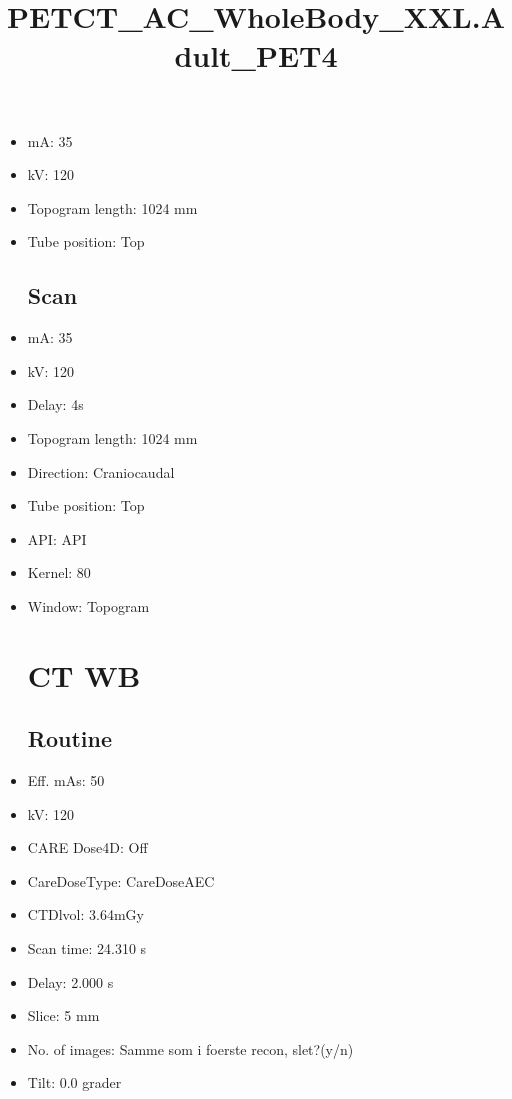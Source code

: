 \documentclass[12pt]{article}
\title{PETCT\_AC\_WholeBody\_XXL.Adult\_PET4}
\begin{document}
\maketitle
\newpage
\tableofcontents
\newpage
{}


\begin{itemize}\section{Topogram}
\subsection{Routine}
\item mA: 35\item kV: 120\item Topogram length: 1024 mm\item Tube position: Top
\subsection{Scan}\item mA: 35\item kV: 120\item Delay: 4s\item Topogram length: 1024 mm\item Direction: Craniocaudal\item Tube position: Top\item API: API \item Kernel: 80\item Window: Topogram
\section{CT WB}
\subsection{Routine}
\item Eff. mAs: 50\item kV: 120\item CARE Dose4D: Off\item CareDoseType: CareDoseAEC\item CTDlvol: 3.64mGy\item Scan time: 24.310 s\item Delay: 2.000 s\item Slice: 5 mm\item No. of images: Samme som i foerste recon, slet?(y/n)\item Tilt: 0.0 grader

\end{itemize}
\end{document}
